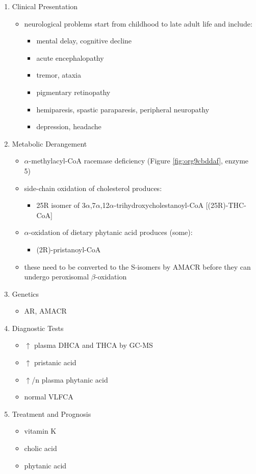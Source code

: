 \documentclass{scrartcl}
\begin{document}
\begin{enumerate}
\item Clinical Presentation
\label{sec:org5fbe81e}
\begin{itemize}
\item neurological problems start from childhood to late adult life and
include:
\begin{itemize}
\item mental delay, cognitive decline
\item acute encephalopathy
\item tremor, ataxia
\item pigmentary retinopathy
\item hemiparesis, spastic paraparesis, peripheral neuropathy
\item depression, headache
\end{itemize}
\end{itemize}

\item Metabolic Derangement
\label{sec:orgb709db0}
\begin{itemize}
\item \(\alpha\)-methylacyl-CoA racemase deficiency (Figure \ref{fig:org9cbddaf}, enzyme 5)
\item side-chain oxidation of cholesterol produces:
\begin{itemize}
\item 25R isomer of 3\(\alpha\),7\(\alpha\),12\(\alpha\)-trihydroxycholestanoyl-CoA [(25R)-THC-CoA]
\end{itemize}
\item \(\alpha\)-oxidation of dietary phytanic acid produces (some):
\begin{itemize}
\item (2R)-pristanoyl-CoA
\end{itemize}
\item these need to be converted to the S-isomers by AMACR before they can
undergo peroxisomal \(\beta\)-oxidation
\end{itemize}

\item Genetics
\label{sec:org710a38b}
\begin{itemize}
\item AR, AMACR
\end{itemize}

\item Diagnostic Tests
\label{sec:orgbc6c059}
\begin{itemize}
\item \(\uparrow\) plasma DHCA and THCA by GC-MS
\item \(\uparrow\) pristanic acid
\item \(\uparrow\)/n plasma phytanic acid
\item normal VLFCA
\end{itemize}

\item Treatment and Prognosis
\label{sec:org57bae5c}
\begin{itemize}
\item vitamin K
\item cholic acid
\item phytanic acid
\end{itemize}
\end{enumerate}
\end{document}
